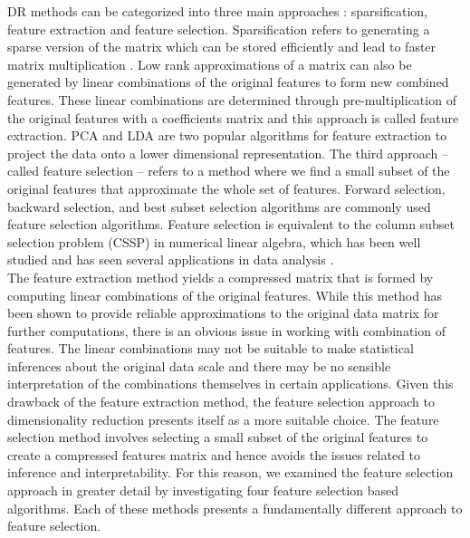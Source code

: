 DR methods can be categorized into three main approaches \cite{ghashami_frequent_2015}: sparsification, feature extraction and feature selection. Sparsification refers to generating a sparse version of the matrix which can be stored efficiently and lead to faster matrix multiplication \cite{achlioptas_fast_2007, drineas_note_2011}. Low rank approximations of a matrix can also be generated by linear combinations of the original features to form new combined features. These linear combinations are determined through pre-multiplication of the original features with a coefficients matrix and this approach is called feature extraction. PCA \cite{pearson1901} and LDA \cite{fisher_use_1936} are two popular algorithms for feature extraction to project the data onto a lower dimensional representation. The third approach -- called feature selection -- refers to a method where we find a small subset of the original features that approximate the whole set of features. Forward selection, backward selection, and best subset selection \cite{james_introduction_2013} algorithms are commonly used feature selection algorithms. Feature selection is equivalent to the column subset selection problem (CSSP) in numerical linear algebra, which has been well studied and has seen several applications in data analysis \cite{boutsidis_improved_2009, deshpande_matrix_2006, drineas_fast_2012, drineas_fast_2006, drineas_sampling_2006, drineas_relative-error_2008, drineas_faster_2011, mahoney_cur_2009, papailiopoulos_provable_2014}. \\

The feature extraction method yields a compressed matrix that is formed by computing linear combinations of the original features. While this method has been shown to provide reliable approximations to the original data matrix for further computations, there is an obvious issue in working with combination of features. The linear combinations may not be suitable to make statistical inferences about the original data scale and there may be no sensible interpretation of the combinations themselves in certain applications. Given this drawback of the feature extraction method, the feature selection approach to dimensionality reduction presents itself as a more suitable choice. The feature selection method involves selecting a small subset of the original features to create a compressed features matrix and hence avoids the issues related to inference and interpretability. For this reason, we examined the feature selection approach in greater detail by investigating four feature selection based algorithms. Each of these methods presents a fundamentally different approach to feature selection. \\

